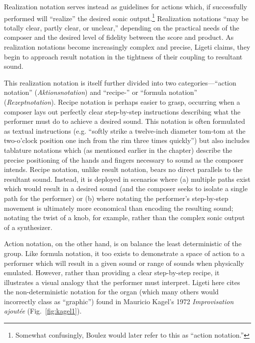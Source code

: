 
    Realization notation serves instead as guidelines for actions which, if successfully performed will ``realize'' the desired sonic output.\footnote{Somewhat confusingly, Boulez would later refer to this as ``action notation.''} Realization notations ``may be totally clear, partly clear, or unclear,'' depending on the practical needs of the composer and the desired level of fidelity between the score and product. As realization notations become increasingly complex and precise, Ligeti claims, they begin to approach result notation in the tightness of their coupling to resultant sound.\autocite[pg. 178 in Ernst et al., 1965.]{Ligeti_forthcoming}

    This realization notation is itself further divided into two categories---``action notation'' (\textit{Aktionsnotation}) and ``recipe-'' or ``formula notation'' (\textit{Rezeptnotation}). Recipe notation is perhaps easier to grasp, occurring when a composer lays out perfectly clear step-by-step instructions describing what the performer must do to achieve a desired sound. This notation is often formulated as textual instructions (e.g. ``softly strike a twelve-inch diameter tom-tom at the two-o'clock position one inch from the rim three times quickly'') but also includes tablature notations which (as mentioned earlier in the chapter) describe the precise positioning of the hands and fingers necessary to sound as the composer intends. Recipe notation, unlike result notation, bears no direct parallels to the resultant sound. Instead, it is deployed in scenarios where (a) multiple paths exist which would result in a desired sound (and the composer seeks to isolate a single path for the performer) or (b) where notating the performer's step-by-step movement is ultimately more economical than encoding the resulting sound; notating the twist of a knob, for example, rather than the complex sonic output of a synthesizer.

    Action notation, on the other hand, is on balance the least deterministic of the group. Like formula notation, it too exists to demonstrate a space of action to a performer which will result in a given sound or range of sounds when physically emulated. However, rather than providing a clear step-by-step recipe, it illustrates a visual analogy that the performer must interpret. Ligeti here cites the non-deterministic notation for the organ (which many others would incorrectly class as ``graphic'') found in Mauricio Kagel's 1972 \textit{Improvisation ajoutée} (Fig.~\ref{fig:kagel1}). 

